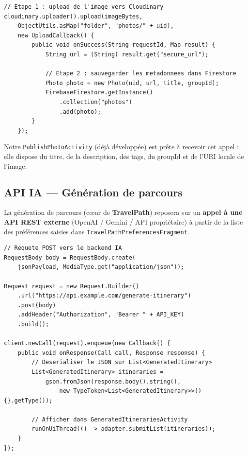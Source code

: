 \documentclass[a4paper,11pt]{article}
\newenvironment{codeblock}{
    \par\noindent\minipage{\linewidth}\vspace{4pt}
}{
    \vspace{4pt}\endminipage\par
}
\begin{document}
\begin{codeblock}
\begin{lstlisting}[caption={Pattern d'upload prévu : Cloudinary + Firestore}]
// Etape 1 : upload de l'image vers Cloudinary
cloudinary.uploader().upload(imageBytes,
    ObjectUtils.asMap("folder", "photos/" + uid),
    new UploadCallback() {
        public void onSuccess(String requestId, Map result) {
            String url = (String) result.get("secure_url");

            // Etape 2 : sauvegarder les metadonnees dans Firestore
            Photo photo = new Photo(uid, url, title, groupId);
            FirebaseFirestore.getInstance()
                .collection("photos")
                .add(photo);
        }
    });
\end{lstlisting}
\end{codeblock}

\noindent Notre \texttt{PublishPhotoActivity} (déjà développée) est prête à recevoir cet appel : elle dispose du titre, de la description, des tags, du groupId et de l'URI locale de l'image.

\subsection{API IA — Génération de parcours}

La génération de parcours (cœur de \textbf{TravelPath}) reposera sur un \textbf{appel à une API REST externe} (OpenAI / Gemini / API propriétaire) à partir de la liste des préférences saisies dans \texttt{TravelPathPreferencesFragment}.

\begin{codeblock}
\begin{lstlisting}[caption={Appel API prévu pour la génération de parcours}]
// Requete POST vers le backend IA
RequestBody body = RequestBody.create(
    jsonPayload, MediaType.get("application/json"));

Request request = new Request.Builder()
    .url("https://api.example.com/generate-itinerary")
    .post(body)
    .addHeader("Authorization", "Bearer " + API_KEY)
    .build();

client.newCall(request).enqueue(new Callback() {
    public void onResponse(Call call, Response response) {
        // Deserialiser le JSON sur List<GeneratedItinerary>
        List<GeneratedItinerary> itineraries =
            gson.fromJson(response.body().string(),
                new TypeToken<List<GeneratedItinerary>>(){}.getType());

        // Afficher dans GeneratedItinerariesActivity
        runOnUiThread(() -> adapter.submitList(itineraries));
    }
});
\end{lstlisting}
\end{codeblock}
\end{document}

